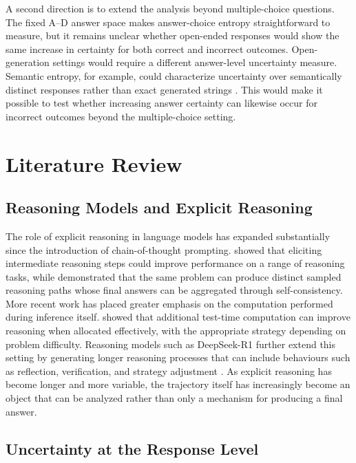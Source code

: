 \documentclass{article}
\begin{document}
A second direction is to extend the analysis beyond multiple-choice questions. The fixed A--D answer space makes answer-choice entropy straightforward to measure, but it remains unclear whether open-ended responses would show the same increase in certainty for both correct and incorrect outcomes. Open-generation settings would require a different answer-level uncertainty measure. Semantic entropy, for example, could characterize uncertainty over semantically distinct responses rather than exact generated strings \citep{kuhn2023semantic,farquhar2024semantic}. This would make it possible to test whether increasing answer certainty can likewise occur for incorrect outcomes beyond the multiple-choice setting.



\section{Literature Review}

\subsection{Reasoning Models and Explicit Reasoning}

The role of explicit reasoning in language models has expanded substantially since the introduction of chain-of-thought prompting. \citet{wei2022chain} showed that eliciting intermediate reasoning steps could improve performance on a range of reasoning tasks, while \citet{wang2023selfconsistency} demonstrated that the same problem can produce distinct sampled reasoning paths whose final answers can be aggregated through self-consistency. More recent work has placed greater emphasis on the computation performed during inference itself. \citet{snell2025scaling} showed that additional test-time computation can improve reasoning when allocated effectively, with the appropriate strategy depending on problem difficulty. Reasoning models such as DeepSeek-R1 further extend this setting by generating longer reasoning processes that can include behaviours such as reflection, verification, and strategy adjustment \citep{guo2025deepseek}. As explicit reasoning has become longer and more variable, the trajectory itself has increasingly become an object that can be analyzed rather than only a mechanism for producing a final answer.

\subsection{Uncertainty at the Response Level}
\end{document}
